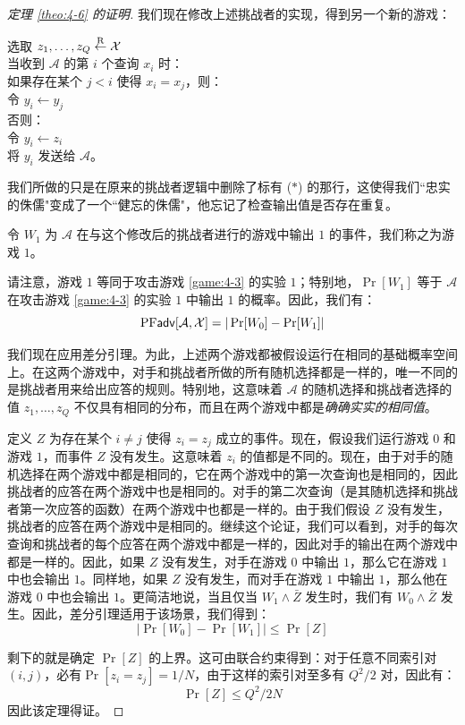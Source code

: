 \begin{proof}[定理 \ref{theo:4-6} 的证明]
我们现在修改上述挑战者的实现，得到另一个新的游戏：

\vspace{5pt}

\hspace*{5pt} 选取 $z_1,\dots,z_Q\overset{\rm R}\leftarrow\mathcal{X}$\\
\hspace*{26pt} 当收到 $\mathcal{A}$ 的第 $i$ 个查询 $x_i$ 时：\\
\hspace*{50pt} 如果存在某个 $j<i$ 使得 $x_i=x_j$，则：\\
\hspace*{75pt} 令 $y_i\leftarrow y_j$\\
\hspace*{50pt} 否则：\\
\hspace*{75pt} 令 $y_i\leftarrow z_i$\\
\hspace*{50pt} 将 $y_i$ 发送给 $\mathcal{A}$。

\vspace{5pt}

我们所做的只是在原来的挑战者逻辑中删除了标有 ($*$) 的那行，这使得我们``忠实的侏儒"变成了一个``健忘的侏儒"，他忘记了检查输出值是否存在重复。

令 $W_1$ 为 $\mathcal{A}$ 在与这个修改后的挑战者进行的游戏中输出 $1$ 的事件，我们称之为游戏 $1$。

请注意，游戏 $1$ 等同于攻击游戏 \ref{game:4-3} 的实验 $1$；特别地，$\Pr[W_1]$ 等于 $\mathcal{A}$ 在攻击游戏 \ref{game:4-3} 的实验 $1$ 中输出 $1$ 的概率。因此，我们有：
\[
{\rm PF\mathsf{adv}}[\mathcal{A},\mathcal{X}]=|\Pr[W_0]-\Pr[W_1]|
\]

我们现在应用差分引理。为此，上述两个游戏都被假设运行在相同的基础概率空间上。在这两个游戏中，对手和挑战者所做的所有随机选择都是一样的，唯一不同的是挑战者用来给出应答的规则。特别地，这意味着 $\mathcal{A}$ 的随机选择和挑战者选择的值 $z_1,\dots,z_Q$ 不仅具有相同的分布，而且在两个游戏中都是\emph{确确实实的相同值}。

定义 $Z$ 为存在某个 $i\neq j$ 使得 $z_i=z_j$ 成立的事件。现在，假设我们运行游戏 $0$ 和游戏 $1$，而事件 $Z$ 没有发生。这意味着 $z_i$ 的值都是不同的。现在，由于对手的随机选择在两个游戏中都是相同的，它在两个游戏中的第一次查询也是相同的，因此挑战者的应答在两个游戏中也是相同的。对手的第二次查询（是其随机选择和挑战者第一次应答的函数）在两个游戏中也都是一样的。由于我们假设 $Z$ 没有发生，挑战者的应答在两个游戏中是相同的。继续这个论证，我们可以看到，对手的每次查询和挑战者的每个应答在两个游戏中都是一样的，因此对手的输出在两个游戏中都是一样的。因此，如果 $Z$ 没有发生，对手在游戏 $0$ 中输出 $1$，那么它在游戏 $1$ 中也会输出 $1$。同样地，如果 $Z$ 没有发生，而对手在游戏 $1$ 中输出 $1$，那么他在游戏 $0$ 中也会输出 $1$。更简洁地说，当且仅当 $W_1\land\bar{Z}$ 发生时，我们有 $W_0\land\bar{Z}$ 发生。因此，差分引理适用于该场景，我们得到：
\[
|\Pr[W_0]-\Pr[W_1]|\leq\Pr[Z]
\]

剩下的就是确定 $\Pr[Z]$ 的上界。这可由联合约束得到：对于任意不同索引对 $(i,j)$，必有$\Pr[z_i=z_j]={1}/{N}$，由于这样的索引对至多有 ${Q^2}/{2}$ 对，因此有：
\[
\Pr[Z]\leq{Q^2}/{2N}
\]
因此该定理得证。
\end{proof}

